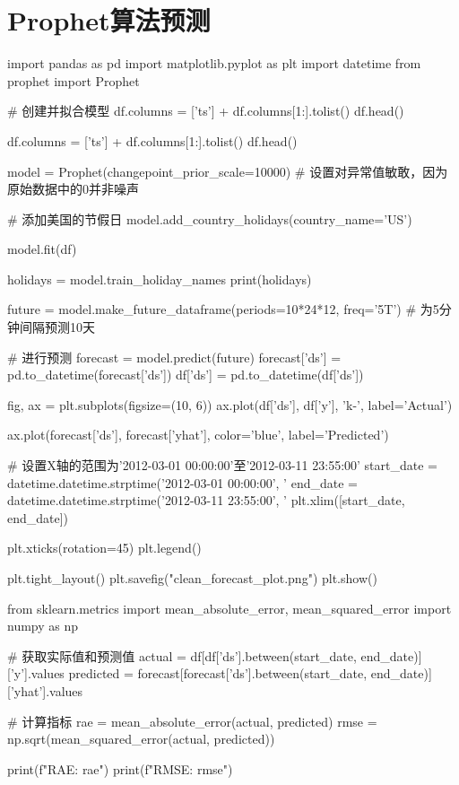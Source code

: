 \documentclass[4pt]{article}
\begin{document}
\section{Prophet算法预测}
 \begin{python}
import pandas as pd
import matplotlib.pyplot as plt
import datetime
from prophet import Prophet

# 创建并拟合模型
df.columns = ['ts'] + df.columns[1:].tolist()
df.head()

df.columns = ['ts'] + df.columns[1:].tolist()
df.head()

model = Prophet(changepoint_prior_scale=10000) # 设置对异常值敏敢，因为原始数据中的0并非噪声

# 添加美国的节假日
model.add_country_holidays(country_name='US')

model.fit(df)

holidays = model.train_holiday_names
print(holidays)

future = model.make_future_dataframe(periods=10*24*12, freq='5T')  # 为5分钟间隔预测10天

# 进行预测
forecast = model.predict(future)
forecast['ds'] = pd.to_datetime(forecast['ds'])
df['ds'] = pd.to_datetime(df['ds'])

fig, ax = plt.subplots(figsize=(10, 6))
ax.plot(df['ds'], df['y'], 'k-', label='Actual')

ax.plot(forecast['ds'], forecast['yhat'], color='blue', label='Predicted')

# 设置X轴的范围为'2012-03-01 00:00:00'至'2012-03-11 23:55:00'
start_date = datetime.datetime.strptime('2012-03-01 00:00:00', '%
end_date = datetime.datetime.strptime('2012-03-11 23:55:00', '%
plt.xlim([start_date, end_date])

plt.xticks(rotation=45)
plt.legend()

plt.tight_layout()
plt.savefig("clean_forecast_plot.png")
plt.show()

from sklearn.metrics import mean_absolute_error, mean_squared_error
import numpy as np

# 获取实际值和预测值
actual = df[df['ds'].between(start_date, end_date)]['y'].values
predicted = forecast[forecast['ds'].between(start_date, end_date)]['yhat'].values

# 计算指标
rae = mean_absolute_error(actual, predicted)
rmse = np.sqrt(mean_squared_error(actual, predicted))

print(f"RAE: {rae}")
print(f"RMSE: {rmse}")
\end{python}
\end{document}
